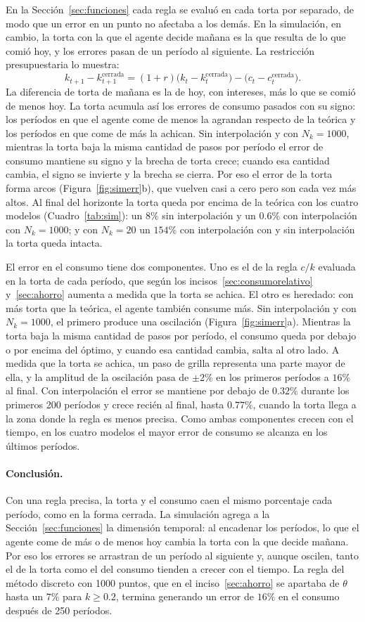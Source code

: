 \documentclass[11pt,a4paper]{article}
\begin{document}
En la Sección~\ref{sec:funciones} cada regla se evaluó en cada torta por separado, de modo que un error en un punto no afectaba a los demás. En la simulación, en cambio, la torta con la que el agente decide mañana es la que resulta de lo que comió hoy, y los errores pasan de un período al siguiente. La restricción presupuestaria lo muestra:
\[
k_{t+1}-k_{t+1}^{\text{cerrada}}=(1+r)\big(k_t-k_t^{\text{cerrada}}\big)-\big(c_t-c_t^{\text{cerrada}}\big).
\]
La diferencia de torta de mañana es la de hoy, con intereses, más lo que se comió de menos hoy. La torta acumula así los errores de consumo pasados con su signo: los períodos en que el agente come de menos la agrandan respecto de la teórica y los períodos en que come de más la achican. Sin interpolación y con $N_k=1000$, mientras la torta baja la misma cantidad de pasos por período el error de consumo mantiene su signo y la brecha de torta crece; cuando esa cantidad cambia, el signo se invierte y la brecha se cierra. Por eso el error de la torta forma arcos (Figura~\ref{fig:simerr}b), que vuelven casi a cero pero son cada vez más altos. Al final del horizonte la torta queda por encima de la teórica con los cuatro modelos (Cuadro~\ref{tab:sim}): un $8\%$ sin interpolación y un $0.6\%$ con interpolación con $N_k=1000$; y con $N_k=20$ un $154\%$ con interpolación con y sin interpolación la torta queda intacta.

El error en el consumo tiene dos componentes. Uno es el de la regla $c/k$ evaluada en la torta de cada período, que según los incisos~\ref{sec:consumorelativo} y~\ref{sec:ahorro} aumenta a medida que la torta se achica. El otro es heredado: con más torta que la teórica, el agente también consume más. Sin interpolación y con $N_k=1000$, el primero produce una oscilación (Figura~\ref{fig:simerr}a). Mientras la torta baja la misma cantidad de pasos por período, el consumo queda por debajo o por encima del óptimo, y cuando esa cantidad cambia, salta al otro lado. A medida que la torta se achica, un paso de grilla representa una parte mayor de ella, y la amplitud de la oscilación pasa de $\pm2\%$ en los primeros períodos a $16\%$ al final. Con interpolación el error se mantiene por debajo de $0.32\%$ durante los primeros 200 períodos y crece recién al final, hasta $0.77\%$, cuando la torta llega a la zona donde la regla es menos precisa. Como ambas componentes crecen con el tiempo, en los cuatro modelos el mayor error de consumo se alcanza en los últimos períodos.

\paragraph{Conclusión.} Con una regla precisa, la torta y el consumo caen el mismo porcentaje cada período, como en la forma cerrada. La simulación agrega a la Sección~\ref{sec:funciones} la dimensión temporal: al encadenar los períodos, lo que el agente come de más o de menos hoy cambia la torta con la que decide mañana. Por eso los errores se arrastran de un período al siguiente y, aunque oscilen, tanto el de la torta como el del consumo tienden a crecer con el tiempo. La regla del método discreto con 1000 puntos, que en el inciso~\ref{sec:ahorro} se apartaba de $\theta$ hasta un $7\%$ para $k\geq0.2$, termina generando un error de $16\%$ en el consumo después de 250 períodos.
\end{document}
